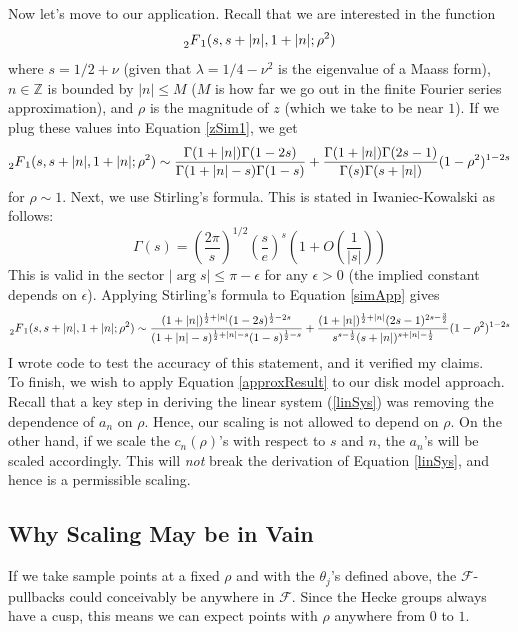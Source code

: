 \documentclass[]{article}
\begin{document}
Now let's move to our application.
Recall that we are interested in the function
$$
\prescript{}{2}{F}_1(s, s + |n|, 1 + |n|; \rho^2)
$$
where $s = 1/2 + \nu$ (given that $\lambda = 1/4 - \nu^2$ is the eigenvalue of a Maass form), $n \in \mathbb{Z}$ is bounded by $|n| \leq M$ ($M$ is how far we go out in the finite Fourier series approximation), and $\rho$ is the magnitude of $z$ (which we take to be near $1$).
If we plug these values into Equation \ref{zSim1}, we get
\begin{equation}\label{simApp}
\prescript{}{2}{F}_1(s, s + |n|, 1 + |n|; \rho^2) \sim
\frac{\Gamma(1 + |n|)\Gamma(1 - 2s)}{\Gamma(1 + |n| - s)\Gamma(1 - s)} +
\frac{\Gamma(1 + |n|)\Gamma(2s-1)}{\Gamma(s)\Gamma(s + |n|)}(1 - \rho^2)^{1 - 2s}
\end{equation}
for $\rho \sim 1$.
Next, we use Stirling's formula.
This is stated in Iwaniec-Kowalski as follows:
$$
\Gamma(s) = \left( \frac{2\pi}{s} \right)^{1/2}\left( \frac{s}{e} \right)^s\left( 1 + O\left( \frac{1}{|s|}\right) \right)
$$
This is valid in the sector $|\arg s| \leq \pi - \epsilon$ for any $\epsilon > 0$ (the implied constant depends on $\epsilon$).
Applying Stirling's formula to Equation \ref{simApp} gives
\begin{equation}\label{approxResult}
\prescript{}{2}{F}_1(s, s + |n|, 1 + |n|; \rho^2) \sim
\frac{(1+|n|)^{\frac{1}{2}+|n|}(1-2s)^{\frac{1}{2}-2s}}{(1+|n|-s)^{\frac{1}{2}+|n|-s}(1-s)^{\frac{1}{2}-s}} +
\frac{(1+|n|)^{\frac{1}{2}+|n|}(2s-1)^{2s-\frac{3}{2}}}{s^{s-\frac{1}{2}}(s+|n|)^{s+|n|-\frac{1}{2}}}(1-\rho^2)^{1-2s}
\end{equation}
I wrote code to test the accuracy of this statement, and it verified my claims.
\\

To finish, we wish to apply Equation \ref{approxResult} to our disk model approach.
Recall that a key step in deriving the linear system (\ref{linSys}) was removing the dependence of $a_n$ on $\rho$.
Hence, our scaling is not allowed to depend on $\rho$.
On the other hand, if we scale the $c_n(\rho)$'s with respect to $s$ and $n$, the $a_n$'s will be scaled accordingly.
This will \textit{not} break the derivation of Equation \ref{linSys}, and hence is a permissible scaling.

\subsection{Why Scaling May be in Vain}

If we take sample points at a fixed $\rho$ and with the $\theta_j$'s defined above, the $\mathcal{F}$-pullbacks could conceivably be anywhere in $\mathcal{F}$.
Since the Hecke groups always have a cusp, this means we can expect points with $\rho$ anywhere from $0$ to $1$.
\end{document}
